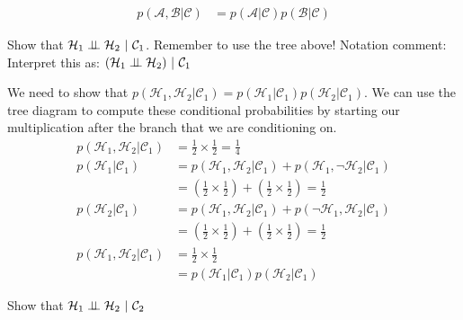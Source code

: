\documentclass[assignment02_Solutions]{subfiles}
\begin{document}
\begin{align}
p(\mathcal{A}, \mathcal{B} | \mathcal{C}) &= p(\mathcal{A} | \mathcal{C}) p(\mathcal{B} | \mathcal{C}) \nonumber
\end{align}

\begin{exercise}[(20 minutes)]
\bes
\item Show that $\mathcal{H}_1 \perp\!\!\!\perp \mathcal{H}_2~|~\mathcal{C}_1$. Remember to use the tree above! Notation comment: Interpret this as: $(\mathcal{H}_1 \perp\!\!\!\perp \mathcal{H}_2 )~|~\mathcal{C}_1$
\begin{boxedsolution}
We need to show that $p(\mathcal{H}_1 , \mathcal{H}_2 | \mathcal{C}_1) = p(\mathcal{H}_1 | \mathcal{C}_1) p(\mathcal{H}_2 | \mathcal{C}_1)$.  We can use the tree diagram to compute these conditional probabilities by starting our multiplication after the branch that we are conditioning on.
\begin{align}
p(\mathcal{H}_1 , \mathcal{H}_2 | \mathcal{C}_1)  &= \frac{1}{2} \times \frac{1}{2} = \frac{1}{4} \nonumber \\
p(\mathcal{H}_1 | \mathcal{C}_1) &= p(\mathcal{H}_1, \mathcal{H}_2 | \mathcal{C}_1) + p(\mathcal{H}_1, \neg \mathcal{H}_2 | \mathcal{C}_1) \nonumber \\
&= \left ( \frac{1}{2} \times \frac{1}{2} \right) + \left ( \frac{1}{2} \times \frac{1}{2} \right) = \frac{1}{2} \nonumber \\
p(\mathcal{H}_2 | \mathcal{C}_1) &= p(\mathcal{H}_1, \mathcal{H}_2 | \mathcal{C}_1) + p(\neg \mathcal{H}_1,  \mathcal{H}_2 | \mathcal{C}_1) \nonumber \\
&= \left ( \frac{1}{2} \times \frac{1}{2} \right) + \left ( \frac{1}{2} \times \frac{1}{2} \right) = \frac{1}{2} \nonumber \\
p(\mathcal{H}_1 , \mathcal{H}_2 | \mathcal{C}_1) &=  \frac{1}{2} \times \frac{1}{2} \nonumber \\
&= p(\mathcal{H}_1 | \mathcal{C}_1) p(\mathcal{H}_2 | \mathcal{C}_1) \nonumber
\end{align}
\end{boxedsolution}
\item Show that $\mathcal{H}_1 \perp\!\!\!\perp \mathcal{H}_2~|~\mathcal{C}_2$


\end{exercise}
\end{document}
